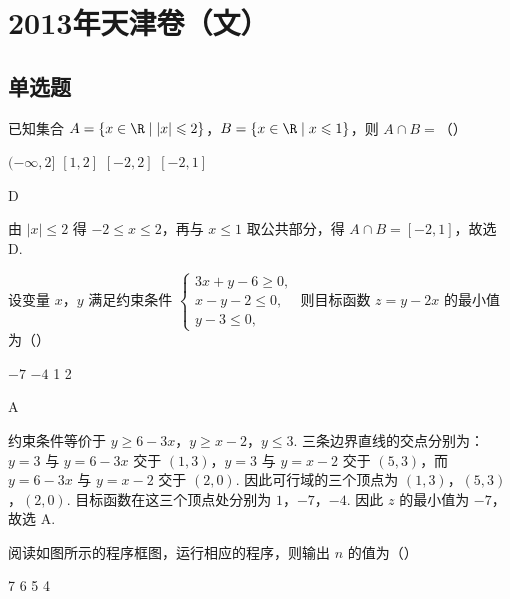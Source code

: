 \chapter{2013年天津卷（文）}

\section{单选题}

\begin{problem}
已知集合 \(A = \{x \in \R \mid |x| \leqslant 2\}\)，\(B = \{x \in \R \mid x \leqslant 1\}\)，则 \(A \cap B =\)（\quad）

\choices
    {\((-\infty, 2]\)}
    {\([1,2]\)}
    {\([-2, 2]\)}
    {\([-2, 1]\)}
\end{problem}

\begin{answer}
D
\end{answer}

\begin{solution}
由 \(|x|\leqslant 2\) 得 \(-2\leqslant x\leqslant 2\)，再与 \(x\leqslant 1\) 取公共部分，得
\(A\cap B=[-2,1]\)，故选 D.
\end{solution}

\begin{problem}
设变量 \(x\)，\(y\) 满足约束条件 \(\begin{cases}
3x + y - 6 \geqslant 0,\\
x - y - 2 \leqslant 0,\\
y - 3 \leqslant 0,
\end{cases}\) 则目标函数 \(z = y - 2x\) 的最小值为（\quad）

\choices
    {\(-7\)}
    {\(-4\)}
    {1}
    {2}
\end{problem}

\begin{answer}
A
\end{answer}

\begin{solution}
约束条件等价于 \(y\geqslant 6-3x\)，\(y\geqslant x-2\)，\(y\leqslant 3\). 三条边界直线的交点分别为：
\(y=3\) 与 \(y=6-3x\) 交于 \((1,3)\)，\(y=3\) 与 \(y=x-2\) 交于 \((5,3)\)，而 \(y=6-3x\) 与 \(y=x-2\) 交于 \((2,0)\). 因此可行域的三个顶点为
\((1,3)\)，\((5,3)\)，\((2,0)\). 目标函数在这三个顶点处分别为
\(1\)，\(-7\)，\(-4\). 因此 \(z\) 的最小值为 \(-7\)，故选 A.
\end{solution}

\begin{problem}
阅读如图所示的程序框图，运行相应的程序，则输出 \(n\) 的值为（\quad）


\choices
    {7}
    {6}
    {5}
    {4}
\end{problem}

